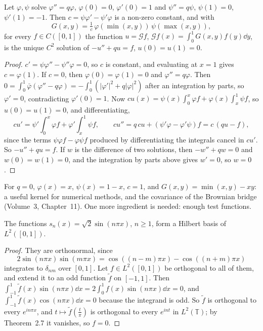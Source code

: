 \begin{lemma}\label{lem:green}
Let $\varphi,\psi$ solve $\varphi''=q\varphi$, $\varphi(0)=0$, $\varphi'(0)=1$ and $\psi''=q\psi$, $\psi(1)=0$, $\psi'(1)=-1$. Then $c=\psi\varphi'-\psi'\varphi$ is a non-zero constant, and with
\[G(x,y)=\tfrac1c\,\varphi(\min(x,y))\,\psi(\max(x,y)),\]
for every $f\in C([0,1])$ the function $u=\mathcal Gf$, $\mathcal Gf(x)=\int_0^1G(x,y)f(y)\dd y$, is the unique $C^2$ solution of $-u''+qu=f$, $u(0)=u(1)=0$.
\end{lemma}
\begin{proof}
$c'=\psi\varphi''-\psi''\varphi=0$, so $c$ is constant, and evaluating at $x=1$ gives $c=\varphi(1)$. If $c=0$, then $\varphi(0)=\varphi(1)=0$ and $\varphi''=q\varphi$. Then
$0=\int_0^1\bar\varphi(\varphi''-q\varphi)=-\int_0^1(|\varphi'|^2+q|\varphi|^2)$ after an integration by parts, so $\varphi'=0$, contradicting $\varphi'(0)=1$. Now
$cu(x)=\psi(x)\int_0^x\varphi f+\varphi(x)\int_x^1\psi f$, so $u(0)=u(1)=0$, and differentiating,
\[cu'=\psi'\int_0^x\varphi f+\varphi'\int_x^1\psi f,\qquad cu''=q\,cu+(\psi'\varphi-\varphi'\psi)f=c\,(qu-f),\]
since the terms $\psi\varphi f-\varphi\psi f$ produced by differentiating the integrals cancel in $cu'$. So $-u''+qu=f$. If $w$ is the difference of two solutions, then $-w''+qw=0$ and $w(0)=w(1)=0$, and the integration by parts
above gives $w'=0$, so $w=0$.
\end{proof}

For $q=0$, $\varphi(x)=x$, $\psi(x)=1-x$, $c=1$, and $G(x,y)=\min(x,y)-xy$: a useful kernel for numerical methods, and the covariance of the Brownian bridge (Volume~3, Chapter~11). One more ingredient
is needed: enough test functions.

\begin{lemma}\label{lem:sines}
The functions $s_n(x)=\sqrt2\sin(n\pi x)$, $n\ge1$, form a Hilbert basis of $L^2([0,1])$.
\end{lemma}
\begin{proof}
They are orthonormal, since
\[2\sin(n\pi x)\sin(m\pi x)=\cos((n-m)\pi x)-\cos((n+m)\pi x)\]
integrates to $\delta_{nm}$ over $[0,1]$. Let $f\in L^2([0,1])$ be orthogonal to all of them, and extend it to an odd function $\tilde f$ on $[-1,1]$. Then
$\int_{-1}^1\tilde f(x)\sin(n\pi x)\dd x=2\int_0^1f(x)\sin(n\pi x)\dd x=0$, and $\int_{-1}^1\tilde f(x)\cos(n\pi x)\dd x=0$ because the integrand is odd. So $\tilde f$ is orthogonal to every $e^{in\pi x}$, and $t\mapsto\tilde f(\frac t\pi)$ is
orthogonal to every $e^{int}$ in $L^2(\mathbb T)$; by Theorem~2.7 it vanishes, so $f=0$.
\end{proof}

